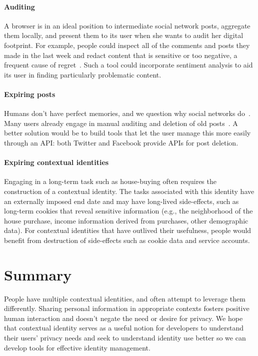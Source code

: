 \documentclass[10pt, conference, compsocconf]{IEEEtran}
\begin{document}
\paragraph{Auditing}
A browser is in an ideal position to intermediate social network
posts, aggregate them locally, and present them to its user when she wants to
audit her digital footprint.  For example, people could inspect all of the
comments and posts they made in the last week and redact content that is
sensitive or too negative, a frequent cause of regret~\cite{wang}. 
Such a tool could incorporate sentiment analysis to aid its user in finding
particularly problematic content.

\paragraph{Expiring posts}
Humans don't have perfect memories, and we question why social networks
do~\cite{delete}. Many users already engage in manual auditing and
deletion of old posts~\cite{fbtips2}. A better solution would be to build tools
that let the user manage this more easily through an API: both Twitter and
Facebook provide APIs for post deletion.

\paragraph{Expiring contextual identities}
Engaging in a long-term task such as house-buying often requires the
construction of a contextual identity. The tasks associated with this identity
have an externally imposed end date and may have long-lived side-effects, such
as long-term cookies that reveal sensitive information (e.g., the neighborhood
of the house purchase, income information derived from purchases, other
demographic data). For contextual identities that have outlived their
usefulness, people would benefit from destruction of side-effects such as cookie
data and service accounts.

\section{Summary}
People have multiple contextual identities, and often attempt to leverage them differently. Sharing personal information in
appropriate contexts fosters positive human interaction and doesn't negate the need or desire for privacy. We hope that
contextual identity serves as a useful notion for developers to understand
their users' privacy needs and seek to understand identity use better so we can develop tools for effective identity management.

\begin{comment}
\section{Acknowledgements}
The authors thank
Lucas Adamski
Ben Adida
Mike Connor
Chris Karlof
\end{comment}



\end{document}
